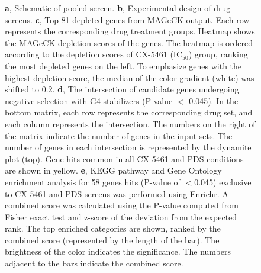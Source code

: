 \begin{figure}
  \caption{
        \newline
        \textbf{a}, Schematic of pooled screen.
        \newline
        \textbf{b}, Experimental design of drug screens. 
        \newline
        \textbf{c}, Top 81 depleted genes from MAGeCK output. Each row represents the corresponding drug treatment groups. Heatmap shows the MAGeCK depletion scores of the genes. The heatmap is ordered according to the depletion scores of CX-5461 (IC$_{50}$) group, ranking the most depleted genes on the left. To emphasize genes with the highest depletion score, the median of the color gradient (white) was shifted to 0.2.
        \newline
        \textbf{d}, The intersection of candidate genes undergoing negative selection with G4 stabilizers (P-value $<$ 0.045). In the bottom matrix, each row represents the corresponding drug set, and each column represents the intersection. The numbers on the right of the matrix indicate the number of genes in the input sets. The number of genes in each intersection is represented by the dynamite plot (top). Gene hits common in all CX-5461 and PDS conditions are shown in  yellow.
        \newline
        \textbf{e}, KEGG pathway and Gene Ontology enrichment analysis for 58 genes hits (P-value of $<$0.045) exclusive to CX-5461 and PDS screens was performed using Enrichr. A combined score was calculated using the P-value computed from Fisher exact test and z-score of the deviation from the expected rank. The top enriched categories are shown, ranked by the combined score (represented by the length of the bar). The brightness of the color indicates the significance. The numbers adjacent to the bars indicate the combined score.  
  }
\end{figure}
\clearpage

